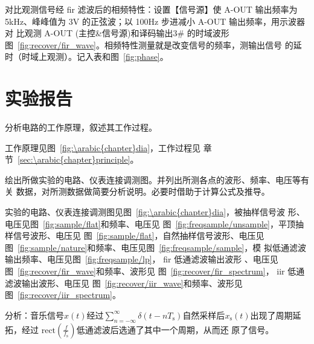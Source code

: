\documentclass[../main]{subfiles}
\begin{document}
    对比观测信号经 fir 滤波后的相频特性：设置【信号源】使 A-OUT 输出频率为
    5kHz、峰峰值为 3V 的正弦波；以 100Hz 步进减小 A-OUT 输出频率，用示波器对
    比观测 A-OUT (主控\&信号源)和译码输出3\# 的时域波形
    图~\ref{fig:recover/fir_wave}。相频特性测量就是改变信号的频率，测输出信号
    的延时（时域上观测）。记入表和图~\ref{fig:phase}。


\section{实验报告}%
\label{sec:\arabic{chapter}report}

\begin{Exercise}
  分析电路的工作原理，叙述其工作过程。
\end{Exercise}

\begin{Answer}
  工作原理见图~\ref{fig:\arabic{chapter}dia}，工作过程见
  章节~\ref{sec:\arabic{chapter}principle}。
\end{Answer}

\begin{Exercise}
  绘出所做实验的电路、仪表连接调测图。并列出所测各点的波形、频率、电压等有关
  数据，对所测数据做简要分析说明。必要时借助于计算公式及推导。
\end{Exercise}

\begin{Answer}
  实验的电路、仪表连接调测图见图~\ref{fig:\arabic{chapter}dia}，被抽样信号波
  形、电压见图~\ref{fig:sample/flat}和频率、电压见
  图~\ref{fig:freqsample/unsample}，平顶抽样信号波形、电压见
  图~\ref{fig:sample/flat}，自然抽样信号波形、电压见
  图~\ref{fig:sample/nature}和频率、电压见图~\ref{fig:freqsample/sample}，模
  拟低通滤波输出频率、电压见图~\ref{fig:freqsample/lp}， fir 低通滤波输出波形
  、电压见图~\ref{fig:recover/fir_wave}和频率、波形见
  图~\ref{fig:recover/fir_spectrum}， iir 低通滤波输出波形、电压见
  图~\ref{fig:recover/iir_wave}和频率、波形见
  图~\ref{fig:recover/iir_spectrum}。

  分析：音乐信号$x(t)$经过$\sum^\infty_{n = -\infty} \delta(t -
  nT_\mathrm{s})$自然采样后$x_\mathrm{s}(t)$出现了周期延拓，经过
  $\mathrm{rect}(\frac{f}{f_\mathrm{s}})$低通滤波后选通了其中一个周期，从而还
  原了信号。
\end{Answer}
\end{document}
